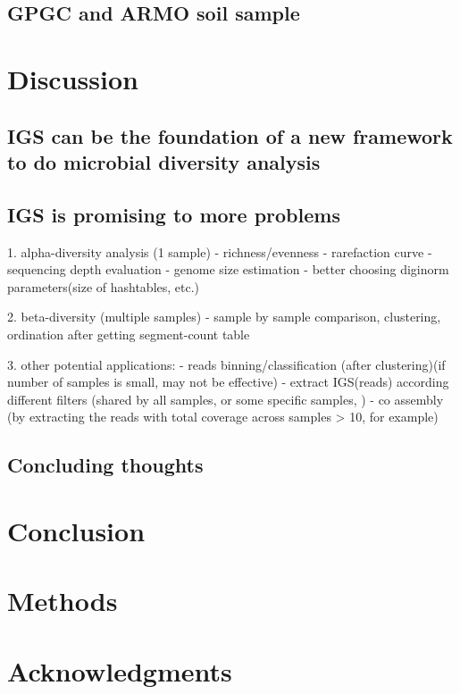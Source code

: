 \subsection{GPGC and ARMO soil sample}

\section{Discussion}

\subsection{IGS can be the foundation of a new framework to do microbial diversity analysis}


\subsection{IGS is promising to more problems}

1. alpha-diversity analysis (1 sample)
    - richness/evenness
    - rarefaction curve
    - sequencing depth evaluation
    - genome size estimation
    - better choosing diginorm parameters(size of hashtables, etc.)

2. beta-diversity (multiple samples)
    - sample by sample comparison, clustering, ordination after getting segment-count table

3. other potential applications:
    - reads binning/classification (after clustering)(if number of samples is small, may not be effective)
    - extract IGS(reads) according different filters (shared by all samples, or some specific samples, )
    - co assembly (by extracting the reads with total coverage across samples > 10, for example)
    
    

\subsection{Concluding thoughts}



\section{Conclusion}

\section{Methods}

\section{Acknowledgments}



